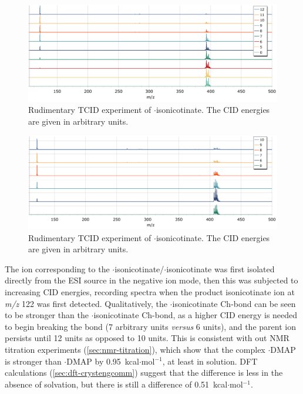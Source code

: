 \begin{refsection}
\begin{figure}
    \centering
    \includegraphics[width=\linewidth]{Figures/ebs-ph-cid.pdf}
    \caption[TCID experiment of $ \cdot $isonicotinate.]{Rudimentary TCID experiment of $ \cdot $isonicotinate. The CID energies are given in arbitrary units.}\label{fig:ebs-ph-tcid}
\end{figure}

\begin{figure}
  \centering
  \includegraphics[width=\linewidth]{Figures/ebs-bn-cid.pdf}
  \caption[TCID experiment of $ \cdot $isonicotinate.]{Rudimentary TCID experiment of $ \cdot $isonicotinate. The CID energies are given in arbitrary units.}\label{fig:ebs-bn-tcid}
\end{figure}

The ion corresponding to the $ \cdot $isonicotinate/$ \cdot $isonicotinate was first isolated directly from the ESI source in the negative ion mode, then this was subjected to increasing CID energies, recording spectra when the product isonicotinate ion at \textit{m/z} 122 was first detected.
Qualitatively, the $ \cdot $isonicotinate Ch-bond can be seen to be stronger than the $ \cdot $isonicotinate Ch-bond, as a higher CID energy is needed to begin breaking the bond (7 arbitrary units \emph{versus} 6 units), and the parent ion persists until 12 units as opposed to 10 units.
This is consistent with out NMR titration experiments (\cref{sec:nmr-titration}), which show that the complex $ \cdot $DMAP is stronger than $ \cdot $DMAP by 0.95~kcal$\cdot$mol$^{-1}$, at least in solution.
DFT calculations (\cref{sec:dft-crystengcomm}) suggest that the difference is less in the absence of solvation, but there is still a difference of 0.51~kcal$\cdot$mol$^{-1}$.


\end{refsection}
